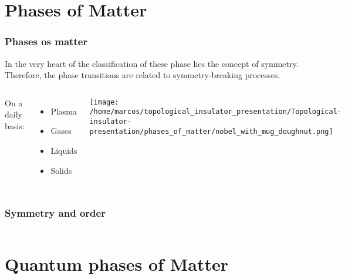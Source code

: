 \section{Phases of Matter}

\begin{frame}
    \frametitle{Phases os matter}
    In the very heart of the classification of these phase lies
    the concept of symmetry. Therefore, the phase transitions
    are related to symmetry-breaking processes.

    \begin{columns}

    On a daily basis:
    \begin{itemize}
        \item Plasma
        \item Gases
        \item Liquids
        \item Solids
    \end{itemize}

    \texttt{[image: /home/marcos/topological\_insulator\_presentation/Topological-insulator-presentation/phases\_of\_matter/nobel\_with\_mug\_doughnut.png]}

    \end{columns}

\end{frame}

\begin{frame}

    \frametitle{Symmetry and order}

    \begin{columns}




    \end{columns}

\end{frame}


\section{Quantum phases of Matter}

